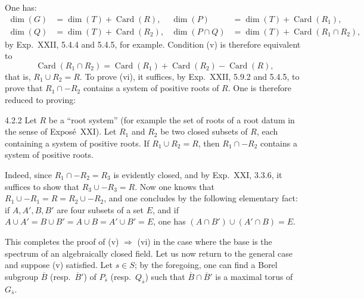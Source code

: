 One has:
\[
\begin{aligned}
\dim(G)&=\dim(T)+\operatorname{Card}(R),&\dim(P)&=\dim(T)+\operatorname{Card}(R_1),\\
\dim(Q)&=\dim(T)+\operatorname{Card}(R_2),&\dim(P\cap Q)&=\dim(T)+\operatorname{Card}(R_1\cap R_2),
\end{aligned}
\]
by Exp.~XXII, 5.4.4 and 5.4.5, for example. Condition (v) is therefore equivalent to
\[
\operatorname{Card}(R_1\cap R_2)=\operatorname{Card}(R_1)+\operatorname{Card}(R_2)-\operatorname{Card}(R),
\]
that is, $R_1\cup R_2=R$. To prove (vi), it suffices, by Exp.~XXII, 5.9.2 and 5.4.5, to prove that $R_1\cap-R_2$ contains a system of positive roots of $R$. One is therefore reduced to proving:
\begin{lemma}{4.2.2}\label{XXVI.4.2.2}
Let $R$ be a ``root system'' (for example the set of roots of a root datum in the sense of Expos\'e~XXI). Let $R_1$ and $R_2$ be two closed subsets of $R$, each containing a system of positive roots. If $R_1\cup R_2=R$, then $R_1\cap-R_2$ contains a system of positive roots.
\end{lemma}
Indeed, since $R_1\cap-R_2=R_3$ is evidently closed, and by Exp.~XXI, 3.3.6, it suffices to show that $R_3\cup-R_3=R$. Now one knows that $R_1\cup-R_1=R=R_2\cup-R_2$, and one concludes by the following elementary fact: if $A,A',B,B'$ are four subsets of a set $E$, and if $A\cup A'=B\cup B'=A\cup B=A'\cup B'=E$, one has $(A\cap B')\cup(A'\cap B)=E$.

This completes the proof of (v) $\Rightarrow$ (vi) in the case where the base is the spectrum of an algebraically closed field. Let us now return to the general case and suppose (v) satisfied. Let $s\in S$; by the foregoing, one can find a Borel subgroup $\overline B$ (resp.~$\overline B'$) of $P_{\overline s}$ (resp.~$Q_{\overline s}$) such that $\overline B\cap\overline B'$ is a maximal torus of $G_{\overline s}$.

